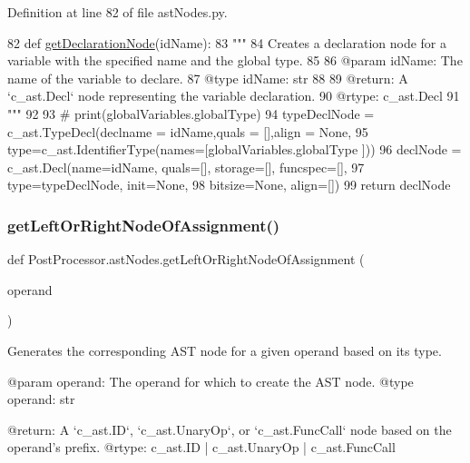 Definition at line 82 of file ast\+Nodes.\+py.


\begin{DoxyCode}
82 \textcolor{keyword}{def }\hyperlink{namespacePostProcessor_1_1astNodes_aebd6602b5bdafed24833f298500fd85c}{getDeclarationNode}(idName):
83     \textcolor{stringliteral}{"""
}
84 \textcolor{stringliteral}{    Creates a declaration node for a variable with the specified name and the global type.
}
85 \textcolor{stringliteral}{
}
86 \textcolor{stringliteral}{    @param idName: The name of the variable to declare.
}
87 \textcolor{stringliteral}{    @type idName: str
}
88 \textcolor{stringliteral}{
}
89 \textcolor{stringliteral}{    @return: A `c\_ast.Decl` node representing the variable declaration.
}
90 \textcolor{stringliteral}{    @rtype: c\_ast.Decl
}
91 \textcolor{stringliteral}{    """}
92     
93     \textcolor{comment}{# print(globalVariables.globalType)
}
94     typeDeclNode = c\_ast.TypeDecl(declname = idName,quals = [],align = \textcolor{keywordtype}{None},
95                                                 type=c\_ast.IdentifierType(names=[globalVariables.globalType
      ]))
96     declNode = c\_ast.Decl(name=idName, quals=[], storage=[], funcspec=[],
97                 type=typeDeclNode, init=\textcolor{keywordtype}{None},
98                 bitsize=\textcolor{keywordtype}{None}, align=[])
99     \textcolor{keywordflow}{return} declNode
\end{DoxyCode}
\mbox{\label{namespacePostProcessor_1_1astNodes_afb1489449acb633bf78b48165fe578be}} 
\subsubsection{\texorpdfstring{get\+Left\+Or\+Right\+Node\+Of\+Assignment()}{getLeftOrRightNodeOfAssignment()}}
{\footnotesize\ttfamily def Post\+Processor.\+ast\+Nodes.\+get\+Left\+Or\+Right\+Node\+Of\+Assignment (\begin{DoxyParamCaption}\item[{}]{operand }\end{DoxyParamCaption})}

\begin{DoxyVerb}Generates the corresponding AST node for a given operand based on its type.

@param operand: The operand for which to create the AST node.
@type operand: str

@return: A `c_ast.ID`, `c_ast.UnaryOp`, or `c_ast.FuncCall` node based on the operand's prefix.
@rtype: c_ast.ID | c_ast.UnaryOp | c_ast.FuncCall
\end{DoxyVerb}
 

